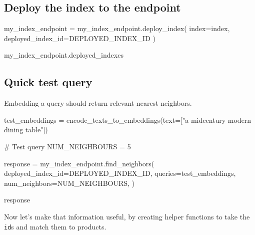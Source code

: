 \documentclass[
  letterpaper,
  DIV=11,
  numbers=noendperiod]{scrreprt}
\newenvironment{Shaded}{\begin{snugshade}}{\end{snugshade}}
\newcommand{\CommentTok}[1]{\textcolor[rgb]{0.37,0.37,0.37}{#1}}
\newcommand{\DecValTok}[1]{\textcolor[rgb]{0.68,0.00,0.00}{#1}}
\newcommand{\NormalTok}[1]{\textcolor[rgb]{0.00,0.23,0.31}{#1}}
\newcommand{\OperatorTok}[1]{\textcolor[rgb]{0.37,0.37,0.37}{#1}}
\newcommand{\StringTok}[1]{\textcolor[rgb]{0.13,0.47,0.30}{#1}}
\begin{document}
\hypertarget{deploy-the-index-to-the-endpoint}{%
\subsection{Deploy the index to the
endpoint}\label{deploy-the-index-to-the-endpoint}}

\begin{Shaded}
\begin{Highlighting}[]
\NormalTok{my\_index\_endpoint }\OperatorTok{=}\NormalTok{ my\_index\_endpoint.deploy\_index(}
\NormalTok{    index}\OperatorTok{=}\NormalTok{index, deployed\_index\_id}\OperatorTok{=}\NormalTok{DEPLOYED\_INDEX\_ID}
\NormalTok{)}

\NormalTok{my\_index\_endpoint.deployed\_indexes}
\end{Highlighting}
\end{Shaded}

\hypertarget{quick-test-query}{%
\subsection{Quick test query}\label{quick-test-query}}

Embedding a query should return relevant nearest neighbors.

\begin{Shaded}
\begin{Highlighting}[]
\NormalTok{test\_embeddings }\OperatorTok{=}\NormalTok{ encode\_texts\_to\_embeddings(text}\OperatorTok{=}\NormalTok{[}\StringTok{"a midcentury modern dining table"}\NormalTok{])}
\end{Highlighting}
\end{Shaded}

\begin{Shaded}
\begin{Highlighting}[]
\CommentTok{\# Test query}
\NormalTok{NUM\_NEIGHBOURS }\OperatorTok{=} \DecValTok{5}

\NormalTok{response }\OperatorTok{=}\NormalTok{ my\_index\_endpoint.find\_neighbors(}
\NormalTok{    deployed\_index\_id}\OperatorTok{=}\NormalTok{DEPLOYED\_INDEX\_ID,}
\NormalTok{    queries}\OperatorTok{=}\NormalTok{test\_embeddings,}
\NormalTok{    num\_neighbors}\OperatorTok{=}\NormalTok{NUM\_NEIGHBOURS,}
\NormalTok{)}

\NormalTok{response}
\end{Highlighting}
\end{Shaded}

Now let's make that information useful, by creating helper functions to
take the \texttt{id}s and match them to products.
\end{document}
